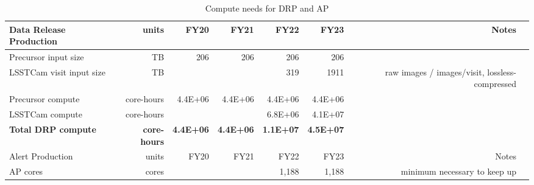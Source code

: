 \tiny \begin{longtable} { |p{}  |r  |r  |r  |r  |r  |r  |r |} 
\caption{Compute needs for DRP and AP \label{tab:drpAndAlertSizing}}\\ 
\hline 
\textbf{Data Release Production}&\textbf{units}&\textbf{FY20}&\textbf{FY21}&\textbf{FY22}&\textbf{FY23}&\textbf{Notes} \\ \hline
{Precursor input size}&{TB}&{206}&{206}&{206}&{206}& \\ \hline
{LSSTCam visit input size}&{TB}&{}&{}&{319}&{1911}&{raw images / images/visit, lossless-compressed} \\ \hline
{Precursor compute}&{core-hours}&{4.4E+06}&{4.4E+06}&{4.4E+06}&{4.4E+06}& \\ \hline
{LSSTCam compute}&{core-hours}&{}&{}&{6.8E+06}&{4.1E+07}& \\ \hline
\textbf{Total DRP compute}&\textbf{core-hours}&\textbf{4.4E+06}&\textbf{4.4E+06}&\textbf{1.1E+07}&\textbf{4.5E+07}& \\ \hline
{Alert Production}&{units}&{FY20}&{FY21}&{FY22}&{FY23}&{Notes} \\ \hline
{AP cores}&{cores}&{}&{}&{1,188}&{1,188}&{minimum necessary to keep up} \\ \hline
\end{longtable} \normalsize
